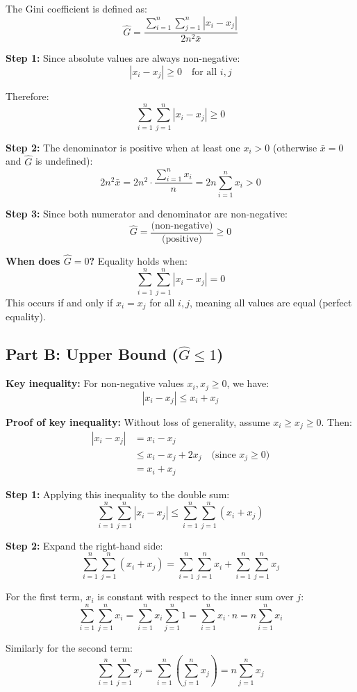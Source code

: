 \documentclass[12pt,a4paper]{article}
\theoremstyle{definition}
\begin{document}
The Gini coefficient is defined as:
\[
\hat{G} = \frac{\sum_{i=1}^n \sum_{j=1}^n |x_i - x_j|}{2n^2 \bar{x}}
\]

\textbf{Step 1:} Since absolute values are always non-negative:
\[
|x_i - x_j| \geq 0 \quad \text{for all } i, j
\]

Therefore:
\[
\sum_{i=1}^n \sum_{j=1}^n |x_i - x_j| \geq 0
\]

\textbf{Step 2:} The denominator is positive when at least one $x_i > 0$ (otherwise $\bar{x} = 0$ and $\hat{G}$ is undefined):
\[
2n^2 \bar{x} = 2n^2 \cdot \frac{\sum_{i=1}^n x_i}{n} = 2n \sum_{i=1}^n x_i > 0
\]

\textbf{Step 3:} Since both numerator and denominator are non-negative:
\[
\hat{G} = \frac{\text{(non-negative)}}{\text{(positive)}} \geq 0
\]

\textbf{When does $\hat{G} = 0$?} Equality holds when:
\[
\sum_{i=1}^n \sum_{j=1}^n |x_i - x_j| = 0
\]
This occurs if and only if $x_i = x_j$ for all $i, j$, meaning all values are equal (perfect equality).

\subsection{Part B: Upper Bound ($\hat{G} \leq 1$)}

\textbf{Key inequality:} For non-negative values $x_i, x_j \geq 0$, we have:
\[
|x_i - x_j| \leq x_i + x_j
\]

\textbf{Proof of key inequality:} Without loss of generality, assume $x_i \geq x_j \geq 0$. Then:
\begin{align*}
|x_i - x_j| &= x_i - x_j \\
&\leq x_i - x_j + 2x_j \quad \text{(since } x_j \geq 0\text{)} \\
&= x_i + x_j
\end{align*}

\textbf{Step 1:} Applying this inequality to the double sum:
\[
\sum_{i=1}^n \sum_{j=1}^n |x_i - x_j| \leq \sum_{i=1}^n \sum_{j=1}^n (x_i + x_j)
\]

\textbf{Step 2:} Expand the right-hand side:
\[
\sum_{i=1}^n \sum_{j=1}^n (x_i + x_j) = \sum_{i=1}^n \sum_{j=1}^n x_i + \sum_{i=1}^n \sum_{j=1}^n x_j
\]

For the first term, $x_i$ is constant with respect to the inner sum over $j$:
\[
\sum_{i=1}^n \sum_{j=1}^n x_i = \sum_{i=1}^n x_i \sum_{j=1}^n 1 = \sum_{i=1}^n x_i \cdot n = n \sum_{i=1}^n x_i
\]

Similarly for the second term:
\[
\sum_{i=1}^n \sum_{j=1}^n x_j = \sum_{i=1}^n \left(\sum_{j=1}^n x_j\right) = n \sum_{j=1}^n x_j
\]
\end{document}
